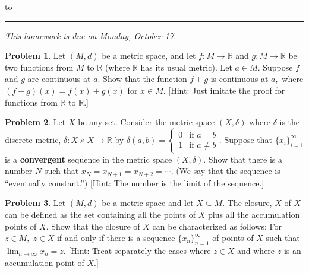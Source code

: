 \documentclass[12pt]{article}
\newcommand{\R}{{\mathbb R}}
\theoremstyle{definition}
\newtheorem{problem}{Problem}
\newenvironment{answer}{\par\medskip\bgroup\color{darkblue}}{\egroup\medskip}
\begin{document}
\hbox to 
\nointerlineskip
\vskip 2pt
\hrule height 1pt

\medskip

\centerline{\textit{This homework is due on Monday, October 17.}}

\bigskip

\def\ds{\displaystyle}

\begin{problem} %
Let $(M,d)$ be a metric space, and let $f\colon M\to \R$ and
$g\colon M\to \R$ be two functions from $M$ to $\R$ (where $\R$ has
its usual metric).  Let $a\in M$.  Suppose $f$ and $g$ are
continuous at $a$.  Show that the function $f+g$ is continuous
at $a,$ where $(f+g)(x) = f(x) + g(x)$ for $x\in M.$
[Hint: Just imitate the proof for functions from $\R$ to $\R.$]
\end{problem}

\begin{answer}
\end{answer}



\begin{problem}  %
Let $X$ be any set. Consider the metric space $(X,\delta)$ where $\delta$ is the
discrete metric, $\delta\colon X\times X\to \R$ by $\delta(a,b) = 
\begin{cases} 0&\text{if }a=b\\ 1&\text{if }a\not=b\end{cases}$.
Suppose that $\{x_i\}_{i=1}^\infty$ is a \textbf{convergent} sequence in the
metric space $(X,\delta).$  Show that there is a number $N$ such
that $x_N=x_{N+1}=x_{N+2}=\cdots$.  (We say that the sequence is
``eventually constant.'') [Hint: The number is the limit of the sequence.]

\end{problem}

\begin{answer}
\end{answer}



\begin{problem}  %
Let $(M,d)$ be a metric space and let $X\subseteq M$. The closure, $\overline{X}$ of $X$ can be
defined as the set containing all the points of $X$ plus all the accumulation
points of $X$.  Show that the
closure of $X$ can be characterized as follows:  For $z\in M,$ $z \in \overline{X}$ if and only if there is a
sequence $\{x_n\}_{n=1}^\infty$ of points of $X$ such that $\displaystyle \lim_{n\to\infty}x_n = z.$
[Hint: Treat separately the cases where $z\in X$ and where $z$ is an accumulation
point of $X.$]
\end{problem}
\end{document}
